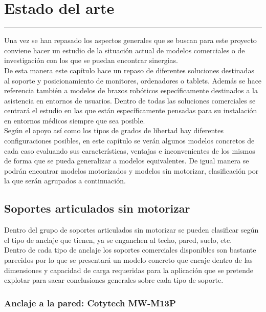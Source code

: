 \textbf{}\chapter{Estado del arte} \label{chap:estadoarte}
\hrule
\vspace{3mm}

Una vez se han repasado los aspectos generales que se buscan para este proyecto conviene hacer un estudio de la situación actual de modelos comerciales o de investigación con los que se puedan encontrar sinergias.
\\

De esta manera este capítulo hace un repaso de diferentes soluciones destinadas al soporte y posicionamiento de monitores, ordenadores o tablets. Además se hace referencia también a modelos de brazos robóticos específicamente destinados a la asistencia en entornos de usuarios. Dentro de todas las soluciones comerciales se centrará el estudio en las que están específicamente pensadas para su instalación en entornos médicos siempre que sea posible.
\\

Según el apoyo así como los tipos de grados de libertad hay diferentes configuraciones posibles, en este capítulo se verán algunos modelos concretos de cada caso evaluando sus características, ventajas e inconvenientes de los mismos de forma que se pueda generalizar a modelos equivalentes. De igual manera se podrán encontrar modelos motorizados y modelos sin motorizar, clasificación por la que serán agrupados a continuación.
\\

\section{Soportes articulados sin motorizar}

Dentro del grupo de soportes articulados sin motorizar se pueden clasificar según el tipo de anclaje que tienen, ya se enganchen al techo, pared, suelo, etc.
\\

Dentro de cada tipo de anclaje los soportes comerciales disponibles son bastante parecidos por lo que se presentará un modelo concreto que encaje dentro de las dimensiones y capacidad de carga requeridas para la aplicación que se pretende explotar para sacar conclusiones generales sobre cada tipo de soporte.

\subsection{Anclaje a la pared: Cotytech MW-M13P}

